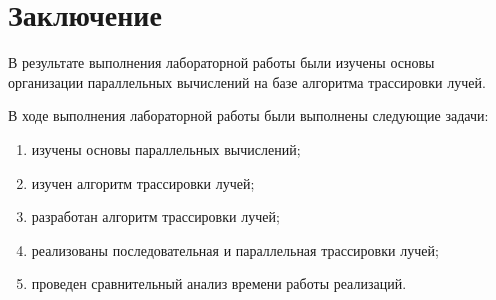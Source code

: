 \chapter*{Заключение}

В результате выполнения лабораторной работы были изучены основы организации параллельных вычислений на базе алгоритма трассировки лучей.

В ходе выполнения лабораторной работы были выполнены следующие задачи: 
\begin{enumerate}[label={\arabic*)}]
	\item изучены основы параллельных вычислений;
	\item изучен алгоритм трассировки лучей;
	\item разработан алгоритм трассировки лучей;
	\item реализованы последовательная и параллельная трассировки лучей;
	\item проведен сравнительный анализ времени работы реализаций.
\end{enumerate}



